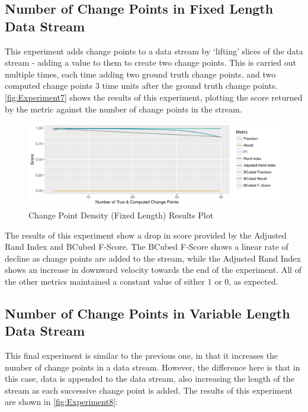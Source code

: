 \documentclass{uvamscse}	%
\begin{document}
\subsection{Number of Change Points in Fixed Length Data Stream}

This experiment adds change points to a data stream by `lifting' slices of the data stream - adding a value to them to create two change points. This is carried out multiple times, each time adding two ground truth change points, and two computed change points 3 time units after the ground truth change points. \autoref{fig:Experiment7} shows the results of this experiment, plotting the score returned by the metric against the number of change points in the stream.

\begin{figure}[h]
    \includegraphics[width=\textwidth]{figures/Experiment8}
    \caption{Change Point Density (Fixed Length) Results Plot}
    \label{fig:Experiment7}
\end{figure}

The results of this experiment show a drop in score provided by the Adjusted Rand Index and BCubed F-Score. The BCubed F-Score shows a linear rate of decline as change points are added to the stream, while the Adjusted Rand Index shows an increase in downward velocity towards the end of the experiment. All of the other metrics maintained a constant value of either $1$ or $0$, as expected.

\subsection{Number of Change Points in Variable Length Data Stream}

This final experiment is similar to the previous one, in that it increases the number of change points in a data stream. However, the difference here is that in this case, data is appended to the data stream, also increasing the length of the stream as each successive change point is added. The results of this experiment are shown in \autoref{fig:Experiment8}:
\end{document}
